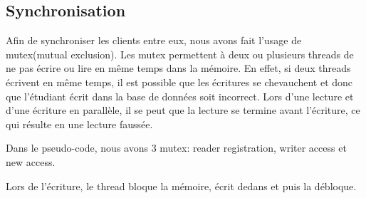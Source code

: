 \documentclass[utf8]{article}
\begin{document}
\begin{large}
\section{Synchronisation}
\par
\indent

Afin de synchroniser les clients entre eux, nous avons fait l'usage de
mutex(mutual exclusion). Les mutex permettent à deux ou plusieurs threads de ne
pas écrire ou lire en même temps dans la mémoire. En effet, si deux threads
écrivent en même temps, il est possible que les écritures se chevauchent et donc
que l'étudiant écrit dans la base de données soit incorrect. Lors d'une lecture
et d'une écriture en parallèle, il se peut que la lecture se termine avant
l'écriture, ce qui résulte en une lecture faussée.
\par
Dans le pseudo-code, nous avons 3 mutex: reader registration, writer access et
new access. 
\par

Lors de l'écriture, le thread bloque la mémoire, écrit dedans et puis la débloque.


\end{large}
\end{document}

